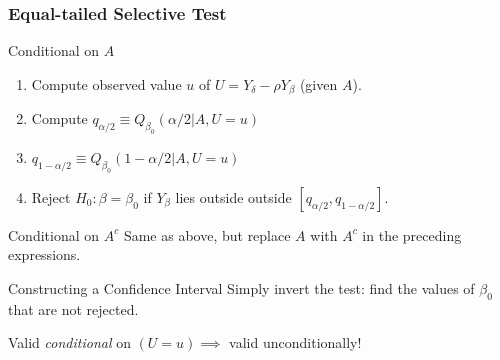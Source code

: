 \begin{frame}
  \frametitle{Equal-tailed Selective Test}
  \small
  
  \begin{block}{Conditional on $A$}
    \begin{enumerate}
      \item Compute observed value $u$ of $U = Y_\delta - \rho Y_\beta$ (given $A$).
      \item Compute $q_{\alpha/2} \equiv Q_{\beta_0}(\alpha/2|A, U=u)$ 
      \item $q_{1 - \alpha/2} \equiv Q_{\beta_0}(1 - \alpha/2|A, U=u)$
      \item Reject $H_0\colon \beta = \beta_0$ if $Y_\beta$ lies outside outside $\left[q_{\alpha/2}, q_{1 - \alpha/2}\right]$.
    \end{enumerate}
  \end{block}
  
  \vspace{-1em}
  \begin{block}{Conditional on $A^c$}
    Same as above, but replace $A$ with $A^c$ in the preceding expressions.
  \end{block}

  \begin{block}{Constructing a Confidence Interval}
    Simply invert the test: find the values of $\beta_0$ that are not rejected.
  \end{block}

  \alert{Valid \emph{conditional} on $(U=u) \implies$ valid unconditionally!}

\end{frame}

